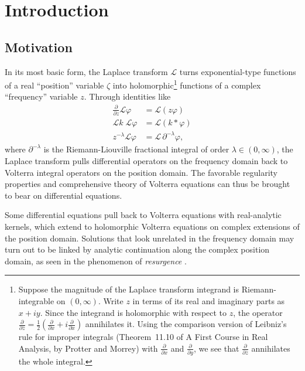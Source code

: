 \documentclass{article}
\theoremstyle{plain}
\newcommand{\laplace}{\mathcal{L}}
\newenvironment{verify}{\color{ForestGreen}}{\color{black}}
\begin{document}
\section{Introduction}
\subsection{Motivation}\label{motivation}
In its most basic form, the Laplace transform $\laplace$ turns exponential-type functions of a real ``position'' variable $\zeta$ into holomorphic\begin{verify}\footnote{\begin{verify}Suppose the magnitude of the Laplace transform integrand is Riemann-integrable on $(0, \infty)$. Write $z$ in terms of its real and imaginary parts as $x + iy$. Since the integrand is holomorphic with respect to $z$, the operator $\frac{\partial}{\partial\overline{z}} = \frac{1}{2}\left(\frac{\partial}{\partial x} + i\frac{\partial}{\partial x}\right)$ annihilates it. Using the comparison version of Leibniz's rule for improper integrals (Theorem~11.10 of A First Course in Real Analysis, by Protter and Morrey) with $\frac{\partial}{\partial x}$ and $\frac{\partial}{\partial y}$, we see that $\frac{\partial}{\partial\overline{z}}$ annihilates the whole integral.\end{verify}}\end{verify} functions of a complex ``frequency'' variable $z$. Through identities like
\begin{align*}
\frac{\partial}{\partial z} \laplace \varphi & = \laplace(z\varphi) \\
\laplace k\;\laplace \varphi & = \laplace(k * \varphi) \\
z^{-\lambda} \laplace \varphi & = \laplace\,\partial^{-\lambda} \varphi,
\end{align*}
where $\partial^{-\lambda}$ is the Riemann-Liouville fractional integral of order $\lambda \in (0, \infty)$, the Laplace transform pulls differential operators on the frequency domain back to Volterra integral operators on the position domain. The favorable regularity properties and comprehensive theory of Volterra equations can thus be brought to bear on differential equations.

Some differential equations pull back to Volterra equations with real-analytic kernels, which extend to holomorphic Volterra equations on complex extensions of the position domain. Solutions that look unrelated in the frequency domain may turn out to be linked by analytic continuation along the complex position domain, as seen in the phenomenon of {\em resurgence} \textcolor{orange}{\cite{EcalleIII}\cite{lectures-marino}}.
\end{document}
